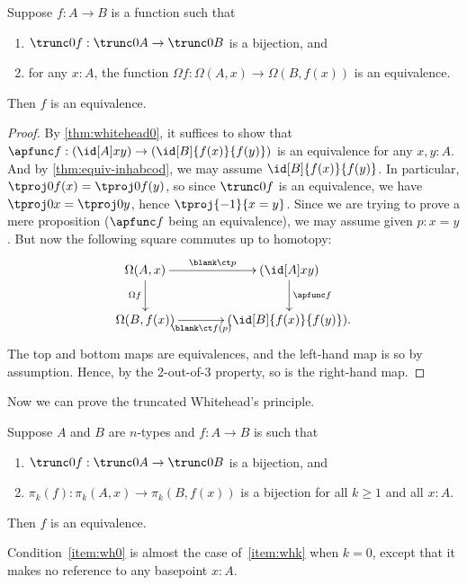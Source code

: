 {\begin{cor}\label{thm:whitehead1}
  Suppose $f:A\to B$ is a function such that
  \begin{enumerate}
  \item $\trunc0 f : \trunc0 A \to \trunc0 B$ is a bijection, and
  \item for any $x:A$, the function $\Omega f : \Omega(A,x) \to \Omega(B,f(x))$ is an equivalence.
  \end{enumerate}
  Then $f$ is an equivalence.
\end{cor}
\begin{proof}
  By \cref{thm:whitehead0}, it suffices to show that $\apfunc f : (\id[A]xy) \to (\id[B]{f(x)}{f(y)})$ is an equivalence for any $x,y:A$.
  And by \cref{thm:equiv-inhabcod}, we may assume $\id[B]{f(x)}{f(y)}$.
  In particular, $\tproj0{f(x)} = \tproj0{f(y)}$, so since $\trunc0 f$ is an equivalence, we have $\tproj0 x = \tproj0y$, hence $\tproj{-1}{x=y}$.
  Since we are trying to prove a mere proposition ($\apfunc f$ being an equivalence), we may assume given $p:x=y$.
  But now the following square commutes up to homotopy:
  \begin{equation*}
  \vcenter{\xymatrix@C=3pc{
      \Omega(A,x)\ar[r]^-{\blank\ct p}\ar[d]_{\Omega f} &
      (\id[A]xy) \ar[d]^{\apfunc f}\\
      \Omega(B,f(x))\ar[r]_-{\blank\ct f(p)} &
      (\id[B]{f(x)}{f(y)}).
      }}
  \end{equation*}
  The top and bottom maps are equivalences, and the left-hand map is so by assumption.
  Hence, by the 2-out-of-3 property, so is the right-hand map.
\end{proof}

Now we can prove the truncated Whitehead's principle.

\begin{thm}\label{thm:whiteheadn}
  Suppose $A$ and $B$ are $n$-types and $f:A\to B$ is such that
  \begin{enumerate}
  \item $\trunc0f:\trunc0A \to \trunc0B$ is a bijection, and\label{item:wh0}
  \item $\pi_k(f):\pi_k(A,x) \to \pi_k(B,f(x))$ is a bijection for all $k\ge 1$ and all $x:A$.\label{item:whk}
  \end{enumerate}
  Then $f$ is an equivalence.
\end{thm}

\noindent
Condition~\ref{item:wh0} is almost the case of~\ref{item:whk} when $k=0$, except that it makes no reference to any basepoint $x:A$.

}

